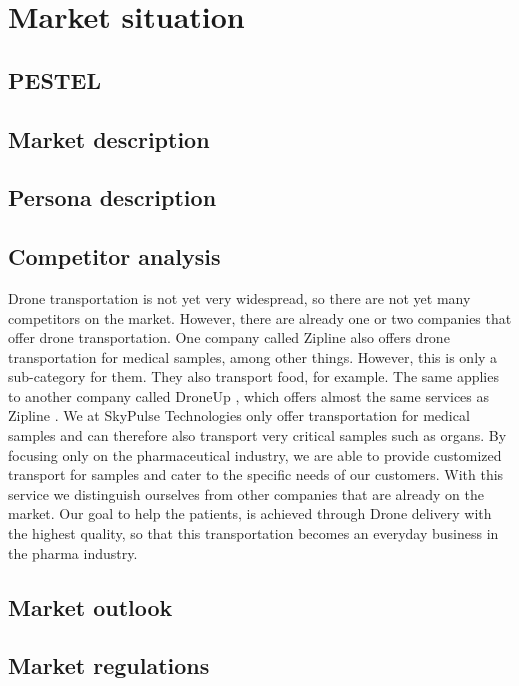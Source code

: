 \chapter{Market situation} \label{market-situation}
\section{PESTEL}
\section{Market description}
\section{Persona description}
\section{Competitor analysis}
Drone transportation is not yet very widespread, so there are not yet many competitors on the market. However, there are already one or two companies that offer drone transportation. One company called Zipline \cite{zipline_24} also offers drone transportation for medical samples, among other things. However, this is only a sub-category for them. They also transport food, for example. The same applies to another company called DroneUp \cite{droneup}, which offers almost the same services as Zipline \cite{zipline_24}. We at SkyPulse Technologies only offer transportation for medical samples and can therefore also transport very critical samples such as organs. By focusing only on the pharmaceutical industry, we are able to provide customized transport for samples and cater to the specific needs of our customers. With this service we distinguish ourselves from other companies that are already on the market. Our goal to help the patients, is achieved through Drone delivery with the highest quality, so that this transportation becomes an everyday business in the pharma industry.
\section{Market outlook}
\section{Market regulations}
